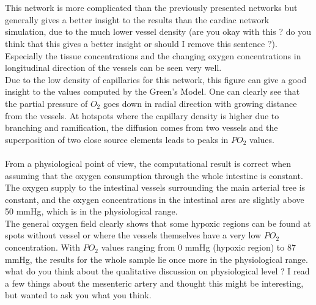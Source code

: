 %
\\
\\This network is more complicated than the previously presented networks but generally gives a better insight to the results than the cardiac network simulation, due to the much lower vessel density {\color{red} (are you okay with this ? do you think that this gives a better insight or should I remove this sentence ?)}. Especially the tissue concentrations and the changing oxygen concentrations in longitudinal direction of the vessels can be seen very well.
\\Due to the low density of capillaries for this network, this figure can give a good insight to the values computed by the Green's Model. One can clearly see that the partial pressure of $O_2$ goes down in radial direction with growing distance from the vessels. At hotspots where the capillary density is higher due to branching and ramification, the diffusion comes from two vessels and the superposition of two close source elements leads to peaks in $PO_2$ values.\\
\\From a physiological point of view, the computational result is correct when assuming that the oxygen consumption through the whole intestine is constant. The oxygen supply to the intestinal vessels surrounding the main arterial tree is constant, and the oxygen concentrations in the intestinal ares are slightly above 50 mmHg, which is in the physiological range.
\\The general oxygen field clearly shows that some hypoxic regions can be found at spots without vessel or where the vessels themselves have a very low $PO_2$ concentration. With $PO_2$ values ranging from $0$ mmHg (hypoxic region) to 87 mmHg, the results for the whole sample lie once more in the physiological range.
\\{\color{red} what do you think about the qualitative discussion on physiological level ? I read a few things about the mesenteric artery and thought this might be interesting, but wanted to ask you what you think.}

